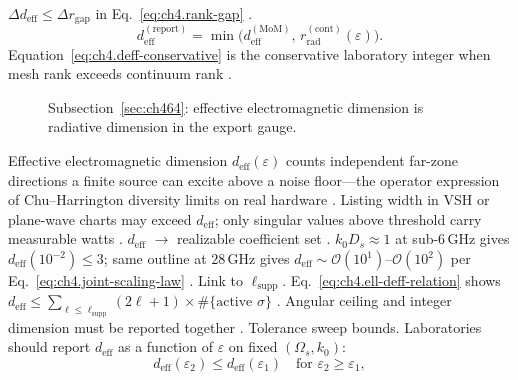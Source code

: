 \label{cor:ch4.deff-mesh-gap}
\(\Delta d_{\mathrm{eff}}\le\Delta r_{\mathrm{gap}}\) in Eq.~\eqref{eq:ch4.rank-gap} \cite{harrington2001}.
\begin{equation}
\label{eq:ch4.deff-conservative}
d_{\mathrm{eff}}^{\mathrm{(report)}}=\min\big(d_{\mathrm{eff}}^{\mathrm{(MoM)}},\,r_{\mathrm{rad}}^{\mathrm{(cont)}}(\varepsilon)\big).
\end{equation}
Equation~\eqref{eq:ch4.deff-conservative} is the conservative laboratory integer when mesh rank exceeds continuum rank
\cite{hansen1988}.
\begin{figure}[t]
\centering
{}
\caption{Subsection~\ref{sec:ch464}: effective electromagnetic dimension is radiative dimension in the export gauge.}
\label{fig:ch4.effective-em-dimension}
\end{figure}
Effective electromagnetic dimension $d_{\mathrm{eff}}(\varepsilon)$ counts independent far-zone directions a finite source can excite above a noise floor---the operator expression of Chu--Harrington diversity limits on real hardware \cite{chu1948}. Listing width in VSH or plane-wave charts may exceed $d_{\mathrm{eff}}$; only singular values above threshold carry measurable watts \cite{stratton1941}.
\(d_{\mathrm{eff}}\) \(\to\) realizable coefficient set \cite{hansen1988}.
\(k_{0}D_{s}\approx1\) at sub-6\,GHz gives \(d_{\mathrm{eff}}(10^{-2})\le3\); same outline at \(28\,\mathrm{GHz}\) gives
\(d_{\mathrm{eff}}\sim\mathcal{O}(10^{1})\)--\(\mathcal{O}(10^{2})\) per Eq.~\eqref{eq:ch4.joint-scaling-law} \cite{jackson1999}.
Link to \(\ell_{\mathrm{supp}}\). Eq.~\eqref{eq:ch4.ell-deff-relation} shows \(d_{\mathrm{eff}}\le\sum_{\ell\le\ell_{\mathrm{supp}}}(2\ell+1)\times\#\{\text{active }\sigma\}\)
\cite{harrington2001}. Angular ceiling and integer dimension must be reported together \cite{hansen1988}.
Tolerance sweep bounds. Laboratories should report \(d_{\mathrm{eff}}\) as a function of \(\varepsilon\) on fixed \((\Omega_{s},k_{0})\):
\begin{equation}
\label{eq:ch4.deff-epsilon-sweep}
d_{\mathrm{eff}}(\varepsilon_{2})\le d_{\mathrm{eff}}(\varepsilon_{1})\quad\text{for }\varepsilon_{2}\ge\varepsilon_{1},
\end{equation}
